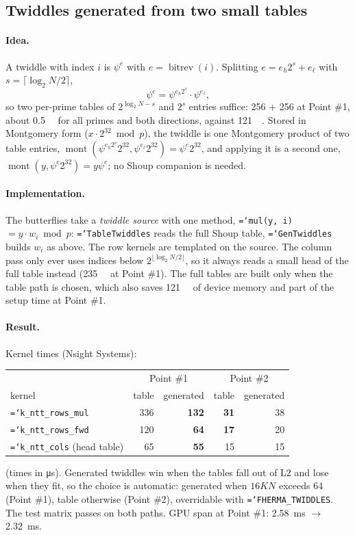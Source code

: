\documentclass[11pt,a4paper]{article}
\newcommand{\code}[1]{\texttt{\hyphenchar\font=`\-\relax #1}}
\newcommand{\ms}[1]{\SI{#1}{\milli\second}}
\newcommand{\MB}[1]{\SI{#1}{\mega\byte}}
\newcommand{\bitrev}{\operatorname{bitrev}}
\begin{document}
\subsection{Twiddles generated from two small tables}

\paragraph{Idea.} A twiddle with index $i$ is $\psi^{e}$ with $e = \bitrev(i)$.
Splitting $e = e_h 2^s + e_\ell$ with $s = \lceil \log_2 N / 2 \rceil$,
\[
  \psi^{e} = \psi^{e_h 2^s} \cdot \psi^{e_\ell},
\]
so two per-prime tables of $2^{\log_2 N - s}$ and $2^s$ entries suffice: 256 + 256 at
Point \#1, about \SI{0.5}{\mega\byte} for all primes and both directions, against
\MB{121}. Stored in Montgomery form ($x \cdot 2^{32} \bmod p$), the twiddle is one
Montgomery product of two table entries,
$\operatorname{mont}(\psi^{e_h 2^s} 2^{32}, \psi^{e_\ell} 2^{32}) = \psi^e 2^{32}$, and
applying it is a second one, $\operatorname{mont}(y, \psi^e 2^{32}) = y \psi^e$; no Shoup
companion is needed.

\paragraph{Implementation.} The butterflies take a \emph{twiddle source} with one
method, \code{mul(y, i)} $= y \cdot w_i \bmod p$: \code{TableTwiddles} reads the full
Shoup table, \code{GenTwiddles} builds $w_i$ as above. The row kernels are templated on
the source. The column pass only ever uses indices below $2^{\lfloor \log_2 N/2 \rfloor}$,
so it always reads a small head of the full table instead (\SI{235}{\kilo\byte} at
Point \#1). The full tables are built only when the table path is chosen, which also
saves \MB{121} of device memory and part of the setup time at Point \#1.

\paragraph{Result.} Kernel times (Nsight Systems):
\begin{center}
\begin{tabular}{lrrrr}
\toprule
 & \multicolumn{2}{c}{Point \#1} & \multicolumn{2}{c}{Point \#2} \\
kernel & table & generated & table & generated \\
\midrule
\code{k\_ntt\_rows\_mul} & 336 & \textbf{132} & \textbf{31} & 38 \\
\code{k\_ntt\_rows\_fwd} & 120 & \textbf{64} & \textbf{17} & 20 \\
\code{k\_ntt\_cols} (head table) & 65 & \textbf{55} & 15 & 15 \\
\bottomrule
\end{tabular}
\end{center}
(times in \si{\micro\second}). Generated twiddles win when the tables fall out of L2 and
lose when they fit, so the choice is automatic: generated when $16KN$ exceeds
\MB{64} (Point \#1), table otherwise (Point \#2), overridable with
\code{FHERMA\_TWIDDLES}. The test matrix passes on both paths. GPU span at Point \#1:
\ms{2.58} $\to$ \ms{2.32}.
\end{document}
